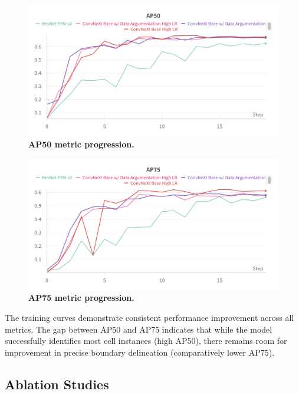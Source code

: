 \documentclass[twocolumn,a4paper]{article}
\begin{document}
\begin{figure}[H]
\centering
\includegraphics[width=0.95\linewidth]{figs/ap50}
\caption{\textbf{AP50 metric progression.}}
\label{fig:ap50}
\end{figure}

\begin{figure}[H]
\centering
\includegraphics[width=0.95\linewidth]{figs/ap75}
\caption{\textbf{AP75 metric progression.}}
\label{fig:ap75}
\end{figure}

The training curves demonstrate consistent performance improvement across all metrics. The gap between AP50 and AP75 indicates that while the model successfully identifies most cell instances (high AP50), there remains room for improvement in precise boundary delineation (comparatively lower AP75).

\subsection{Ablation Studies}
\end{document}
